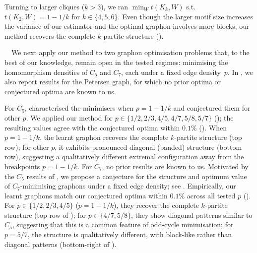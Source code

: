 \documentclass[11pt]{article}
\theoremstyle{plain}
\theoremstyle{definition}
\theoremstyle{remark}
\begin{document}
Turning to larger cliques ($k > 3$), we ran $\min_W t(K_k, W)$ s.t.\ $t(K_2, W){=}1{-}1/k$ for $k\in\{4,5,6\}$. Even though the larger motif size increases the variance of our estimator and the optimal graphon involves more blocks, our method recovers the complete $k$-partite structure ().

\ $\,$
We next apply our method to two graphon optimisation problems that, to the best of our knowledge, remain open in the tested regimes: minimising the homomorphism densities of $C_5$ and $C_7$, each under a fixed edge density~$p$. In , we also report results for the Petersen graph, for which no prior optima or conjectured optima are known to us.

For $C_5$, \citet{bennett2020minimizing} characterised the minimisers when $p=1-1/k$ and conjectured them for other $p$. We applied our method for $p\in\{1/2, 2/3, 4/5, 4/7, 5/8, 5/7\}$ (); the resulting values agree with the conjectured optima within $0.1\%$ (). When $p=1-1/k$, the learnt graphon recovers the complete $k$-partite structure (top row); for other $p$, it exhibits pronounced diagonal (banded) structure (bottom row), suggesting a qualitatively different extremal configuration away from the breakpoints $p = 1-1/k$.
For $C_7$, no prior results are known to us. Motivated by the $C_5$ results of \citet{bennett2020minimizing}, we propose a conjecture for the structure and optimum value of $C_7$-minimising graphons under a fixed edge density; see . Empirically, our learnt graphons match our conjectured optima within $0.1\%$ across all tested $p$ (). For $p\in\{1/2,2/3,4/5\}$ ($p=1-1/k$), they recover the complete $k$-partite structure (top row of ); for $p\in\{4/7,5/8\}$, they show diagonal patterns similar to $C_5$, suggesting that this is a common feature of odd-cycle minimisation; for $p=5/7$, the structure is qualitatively different, with block-like rather than diagonal patterns (bottom-right of ).
\end{document}
